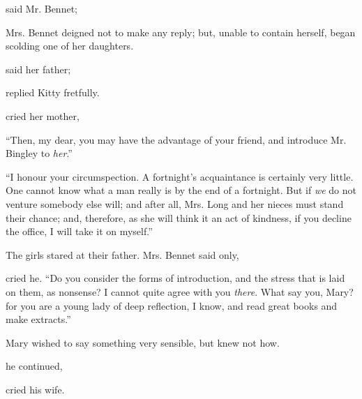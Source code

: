  said Mr. Bennet; 

Mrs. Bennet deigned not to make any reply; but, unable to contain herself, began scolding one of her daughters.


 said her father; 

 replied Kitty fretfully. 


 cried her mother, 

“Then, my dear, you may have the advantage of your friend, and introduce Mr. Bingley to {\em her}.”


“I honour your circumspection. A fortnight's acquaintance is certainly very little. One cannot know what a man really is by the end of a fortnight. But if {\em we} do not venture somebody else will; and after all, Mrs. Long and her nieces must stand their chance; and, therefore, as she will think it an act of kindness, if you decline the office, I will take it on myself.”

The girls stared at their father. Mrs. Bennet said only, 

 cried he. “Do you consider the forms of introduction, and the stress that is laid on them, as nonsense? I cannot quite agree with you {\em there}. What say you, Mary? for you are a young lady of deep reflection, I know, and read great books and make extracts.”

Mary wished to say something very sensible, but knew not how.

 he continued, 

 cried his wife.

